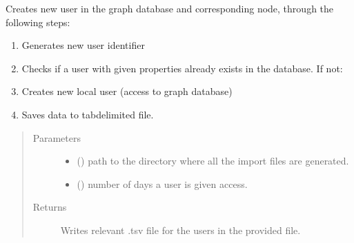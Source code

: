 \documentclass[letterpaper,10pt,english]{sphinxmanual}
\begin{document}
\begin{fulllineitems}
\label{\detokenize{_autosummary/graphdb_builder.users:graphdb_builder.users.users_controller.parseUsersFile}}
Creates new user in the graph database and corresponding node, through the following steps:
\begin{enumerate}
%
\item {} 
Generates new user identifier

\item {} 
Checks if a user with given properties already exists in the database. If not:

\item {} 
Creates new local user (access to graph database)

\item {} 
Saves data to tab\sphinxhyphen{}delimited file.

\end{enumerate}
\begin{quote}\begin{description}
\item[{Parameters}] \leavevmode\begin{itemize}
\item {} 
 () \textendash{} path to the directory where all the import files are generated.

\item {} 
 () \textendash{} number of days a user is given access.

\end{itemize}

\item[{Returns}] \leavevmode
Writes relevant .tsv file for the users in the provided file.

\end{description}\end{quote}

\end{fulllineitems}
\end{document}
